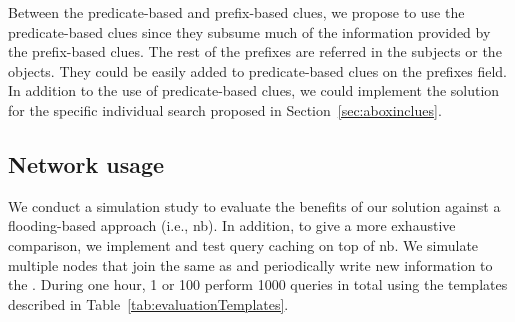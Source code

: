 Between the predicate-based and prefix-based clues, we propose to use the predicate-based clues since they subsume much of the information provided by the prefix-based clues.
The rest of the prefixes are referred in the subjects or the objects.
They could be easily added to predicate-based clues on the prefixes field.
In addition to the use of predicate-based clues, we could implement the solution for the specific individual search proposed in Section~\ref{sec:aboxinclues}.









\subsection{Network usage} %
\label{sec:NetworkUsage}


We conduct a simulation study to evaluate the benefits of our solution against a flooding-based approach (i.e., \ac{nb}).
In addition, to give a more exhaustive comparison, we implement and test query caching on top of \ac{nb}.
We simulate multiple nodes that join the same \Space{} as \providers{} and periodically write new information to the \Space{}.
During one hour, 1 or 100 \consumers{} perform 1000 queries in total using the templates described in Table~\ref{tab:evaluationTemplates}.


